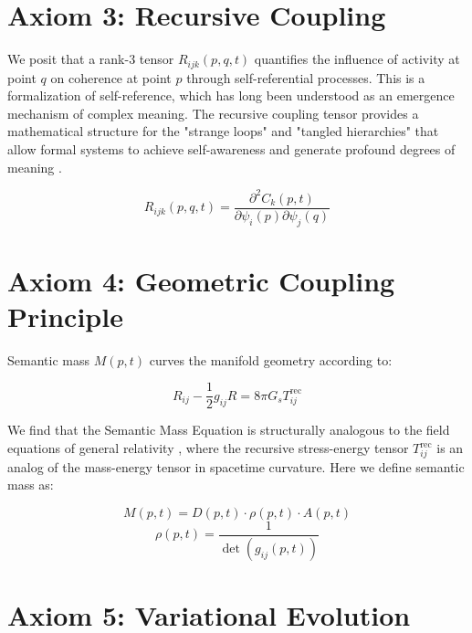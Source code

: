 \section{Axiom 3: Recursive Coupling}\label{axiom_3}

We posit that a rank-3 tensor \(R_{ijk}(p,q,t)\) quantifies the influence of activity at point \(q\) on coherence at point \(p\) through self-referential processes. This is a formalization of self-reference, which has long been understood as an emergence mechanism of complex meaning. The recursive coupling tensor provides a mathematical structure for the "strange loops" and "tangled hierarchies" that allow formal systems to achieve self-awareness and generate profound degrees of meaning \autocite{Hofstadter1979}.

\begin{equation}
R_{ijk}(p,q,t) = \frac{\partial^2 C_k(p,t)}{\partial \psi_i(p) \partial \psi_j(q)}
\end{equation}

\section{Axiom 4: Geometric Coupling Principle}\label{axiom_4}

Semantic mass \(M(p,t)\) curves the manifold geometry according to:

\begin{equation}\label{eq:rft_field_equation_axiom}
R_{ij} - \frac{1}{2}g_{ij}R = 8\pi G_s T^{\text{rec}}_{ij}
\end{equation}

We find that the Semantic Mass Equation is structurally analogous to the field equations of general relativity \autocite{Einstein1915, MisnerThorneWheeler1973, Wald1984}, where the recursive stress-energy tensor \(T^{\text{rec}}_{ij}\) is an analog of the mass-energy tensor in spacetime curvature. Here we define semantic mass as:

\begin{equation}
M(p,t) = D(p,t) \cdot \rho(p,t) \cdot A(p,t)
\end{equation}
\begin{equation}
\rho(p,t) = \frac{1}{\det(g_{ij}(p,t))}
\end{equation}

\section{Axiom 5: Variational Evolution}\label{axiom_5}

